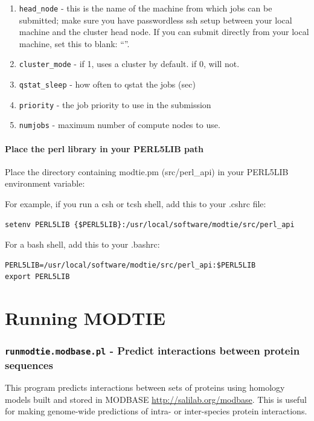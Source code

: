 \documentclass[11pt]{article}
\begin{document}
\begin{itemize}
\begin{enumerate}
   \item {\tt head\_node} - this is the name of the machine from which jobs can be submitted; make sure you have passwordless ssh setup between your local machine and the cluster head node. If you can submit directly from your local machine, set this to blank: ``''.
   \item {\tt cluster\_mode} - if 1, uses a cluster by default. if 0, will not.
   \item {\tt qstat\_sleep} - how often to qstat the jobs (sec)
   \item {\tt priority} - the job priority to use in the submission
   \item {\tt numjobs} - maximum number of compute nodes to use.
\end{enumerate}
\end{itemize}


\subsection{Place the perl library in your PERL5LIB path}
Place the directory containing modtie.pm (src/perl\_api) in your PERL5LIB environment variable:

For example, if you run a csh or tcsh shell, add this to your .cshrc file:
\begin{lstlisting}
setenv PERL5LIB {$PERL5LIB}:/usr/local/software/modtie/src/perl_api
\end{lstlisting}

For a bash shell, add this to your .bashrc:
\begin{lstlisting}
PERL5LIB=/usr/local/software/modtie/src/perl_api:$PERL5LIB
export PERL5LIB
\end{lstlisting}

\part{Running MODTIE}

\section{{\tt runmodtie.modbase.pl} - Predict interactions between protein sequences}

This program predicts interactions between sets of proteins using homology models built and stored in MODBASE \url{http://salilab.org/modbase}.
This is useful for making genome-wide predictions of intra- or inter-species protein interactions.
\end{document}
